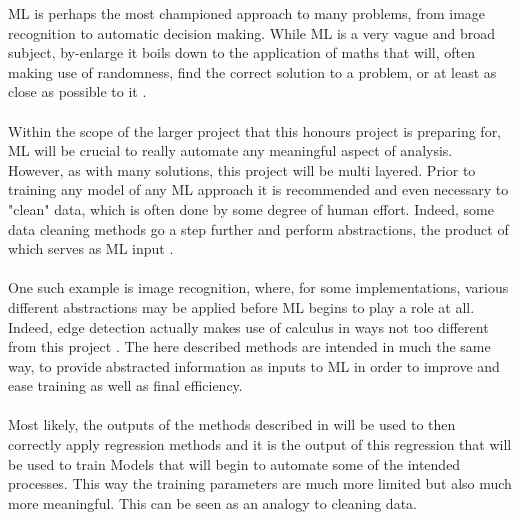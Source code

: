\documentclass[main.tex]{subfiles}
\begin{document}
    ML is perhaps the most championed approach to many problems, from image recognition to automatic decision making. While ML is a very vague and broad subject, by-enlarge it boils down to the application of maths that will, often making use of randomness, find the correct solution to a problem, or at least as close as possible to it \cite[Page~5]{definitionML}.
    \\\\
    Within the scope of the larger project that this honours project is preparing for, ML will be crucial to really automate any meaningful aspect of analysis. However, as with many solutions, this project will be multi layered. Prior to training any model of any ML approach  it is recommended and even necessary to "clean" data, which is often done by some degree of human effort. Indeed, some data cleaning methods go a step further and perform abstractions, the product of which serves as ML input \cite{dataCleaningElite,dataCleaningEngineering,dataCleaningMedium}. 
    \\\\
    One such example is image recognition, where, for some implementations, various different abstractions may be applied before ML begins to play a role at all. Indeed, edge detection actually makes use of calculus in ways not too different from this project \cite{edgeDetect}. The here described methods are intended in much the same way, to provide abstracted information as inputs to ML in order to improve and ease training as well as final efficiency.
    \\\\
    Most likely, the outputs of the methods described in  will be used to then correctly apply regression methods and it is the output of this regression that will be used to train Models that will begin to automate some of the intended processes. This way the training parameters are much more limited but also much more meaningful. This can be seen as an analogy to cleaning data. 
    
\end{document}
